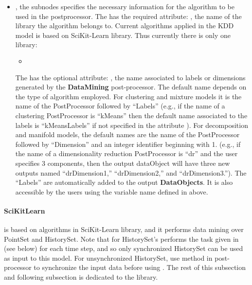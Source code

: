 \begin{itemize}
  \item {} , the subnodes specifies
  the necessary information for the algorithm to be used in the postprocessor.
  The  has the required attribute: , the name of the
  library the algorithm belongs to. Current algorithms applied in the KDD model
  is based on SciKit-Learn library. Thus currently there is only one library:
  \begin{itemize}
    \item {}
  \end{itemize}
  The  has the optional attribute: , the name
  associated to labels or dimensions generated by the \textbf{DataMining}
  post-processor.
  The default name depends on the type of algorithm employed.
  For clustering and mixture models it is the name of the PostProcessor
  followed by ``Labels'' (e.g., if the name of a clustering PostProcessor is
  ``kMeans'' then the default name associated to the labels is ``kMeansLabels''
  if not specified in the attribute ).
  For decomposition and manifold models, the default names are the name of the
  PostProcessor followed by ``Dimension'' and an integer identifier beginning
  with 1. (e.g., if the name of a dimensionality reduction PostProcessor is
  ``dr'' and the user specifies 3 components, then the output dataObject will
  have three new outputs named ``drDimension1,'' ``drDimension2,'' and
  ``drDimension3.'').
  \nb The ``Labels'' are automatically added to the output \textbf{DataObjects}. It
  is also accessible by the users using the variable name defined in above.
\end{itemize}


\paragraph{SciKitLearn}
 is based on algorithms in SciKit-Learn library, and it performs data mining over PointSet and HistorySet. Note that for HistorySet's  performs the task given in  (see below) for each time step, and so only synchronized HistorySet can be used as input to this model. For unsynchronized HistorySet, use  method in  post-processor to synchronize the input data before using . The rest of this subsection and following subsection is dedicated to the  library.

